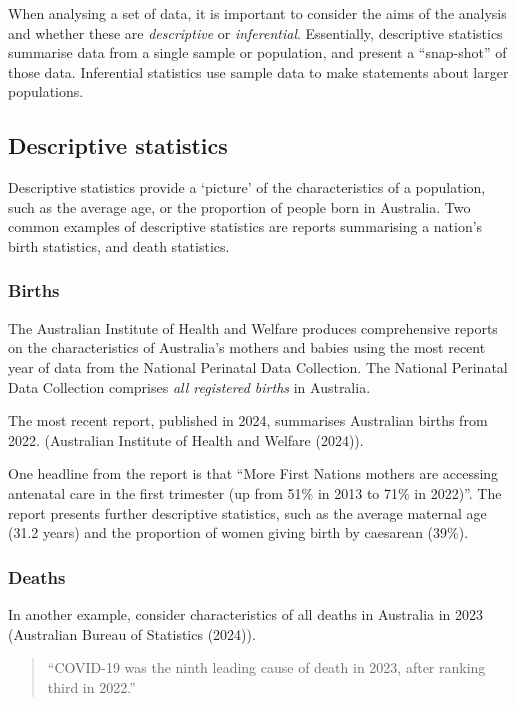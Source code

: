 \documentclass[
  a4paper,
]{memoir}
\begin{document}
When analysing a set of data, it is important to consider the aims of
the analysis and whether these are \emph{descriptive} or
\emph{inferential}. Essentially, descriptive statistics summarise data
from a single sample or population, and present a ``snap-shot'' of those
data. Inferential statistics use sample data to make statements about
larger populations.

\subsection{Descriptive statistics}\label{descriptive-statistics}

Descriptive statistics provide a `picture' of the characteristics of a
population, such as the average age, or the proportion of people born in
Australia. Two common examples of descriptive statistics are reports
summarising a nation's birth statistics, and death statistics.

\subsubsection{Births}\label{births}

The Australian Institute of Health and Welfare produces comprehensive
reports on the characteristics of Australia's mothers and babies using
the most recent year of data from the National Perinatal Data
Collection. The National Perinatal Data Collection comprises \emph{all
registered births} in Australia.

The most recent report, published in 2024, summarises Australian births
from 2022. (Australian Institute of Health and Welfare (2024)).

One headline from the report is that ``More First Nations mothers are
accessing antenatal care in the first trimester (up from 51\% in 2013 to
71\% in 2022)''. The report presents further descriptive statistics,
such as the average maternal age (31.2 years) and the proportion of
women giving birth by caesarean (39\%).

\subsubsection{Deaths}\label{deaths}

In another example, consider characteristics of all deaths in Australia
in 2023 (Australian Bureau of Statistics (2024)).

\begin{quote}
``COVID-19 was the ninth leading cause of death in 2023, after ranking
third in 2022.''
\end{quote}
\end{document}
